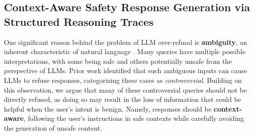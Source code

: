 \documentclass{article} %
\begin{document}
\subsection{Context-Aware Safety Response Generation via Structured Reasoning Traces}
One significant reason behind the problem of LLM over-refusal is \textbf{ambiguity}, an inherent characteristic of natural language \citep{piantadosi2012communicative, liu-etal-2023-afraid}. Many queries have multiple possible interpretations, with some being safe and others potentially unsafe from the perspective of LLMs. Prior work \citep{an2024automatic} identified that such ambiguous inputs can cause LLMs to refuse responses, categorizing these cases as \emph{controversial}. Building on this observation, we argue that many of these controversial queries should not be directly refused, as doing so may result in the loss of information that could be helpful when the user's intent is benign. Namely, responses should be \textbf{context-aware}, following the user's instructions in safe contexts while carefully avoiding the generation of unsafe content.
\end{document}
